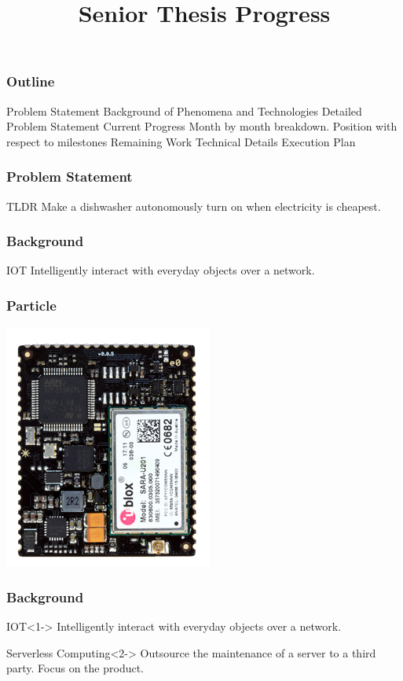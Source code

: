 \documentclass{beamer}
\title{Senior Thesis Progress}
\begin{document}
 
\frame{\titlepage}


\begin{frame}
    \frametitle{Outline}
    \begin{outline}
         Problem Statement
         Background of Phenomena and Technologies
         Detailed Problem Statement
         Current Progress
         Month by month breakdown.
         Position with respect to milestones
         Remaining Work
         Technical Details
         Execution Plan
    \end{outline}
\end{frame} 

\begin{frame}
    \frametitle{Problem Statement}
    \begin{block}{TLDR}
        Make a dishwasher autonomously turn on when electricity is
        cheapest.
    \end{block}
\end{frame}

\begin{frame}
    \frametitle{Background}
    \begin{block}{IOT}
        Intelligently interact with everyday objects over a network.
    \end{block}
\end{frame}

\begin{frame}
    \frametitle{Particle}
    \includegraphics[width=0.6\paperwidth,height=0.6\paperheight,keepaspectratio]{pictures/particle}
\end{frame}

\begin{frame}
    \frametitle{Background}
    \begin{block}{IOT}<1->
        Intelligently interact with everyday objects over a network.
    \end{block}
    \begin{block}{Serverless Computing}<2->
        Outsource the maintenance of a server to a third party. Focus on the product. 
    \end{block}
\end{frame}
\end{document}
